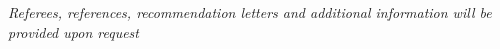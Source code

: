 \documentclass{resume} %
\begin{document}
\vspace{-4pt}
\begin{flushright}
	\small{\textit{Referees, references, recommendation letters and additional information will be provided upon request}}
\end{flushright}
\end{document}
